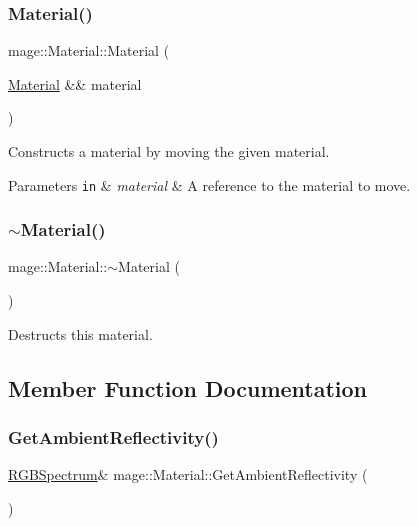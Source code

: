 \subsubsection{\texorpdfstring{Material()}{Material()}\hspace{0.1cm}{\footnotesize\ttfamily [3/3]}}
{\footnotesize\ttfamily mage\+::\+Material\+::\+Material (\begin{DoxyParamCaption}\item[{\hyperlink{structmage_1_1_material}{Material} \&\&}]{material }\end{DoxyParamCaption})\hspace{0.3cm}{\ttfamily [default]}}

Constructs a material by moving the given material.


\begin{DoxyParams}[1]{Parameters}
\mbox{\tt in}  & {\em material} & A reference to the material to move. \\
\hline
\end{DoxyParams}
\hypertarget{structmage_1_1_material_a4ca65b7e24144ee08dd1ce8d0eda9284}{}\label{structmage_1_1_material_a4ca65b7e24144ee08dd1ce8d0eda9284} 
\subsubsection{\texorpdfstring{$\sim$\+Material()}{~Material()}}
{\footnotesize\ttfamily mage\+::\+Material\+::$\sim$\+Material (\begin{DoxyParamCaption}{ }\end{DoxyParamCaption})\hspace{0.3cm}{\ttfamily [default]}}

Destructs this material. 

\subsection{Member Function Documentation}
\hypertarget{structmage_1_1_material_a244df193031de84daf6cb9b8c30f0d72}{}\label{structmage_1_1_material_a244df193031de84daf6cb9b8c30f0d72} 
\subsubsection{\texorpdfstring{Get\+Ambient\+Reflectivity()}{GetAmbientReflectivity()}\hspace{0.1cm}{\footnotesize\ttfamily [1/2]}}
{\footnotesize\ttfamily \hyperlink{structmage_1_1_r_g_b_spectrum}{R\+G\+B\+Spectrum}\& mage\+::\+Material\+::\+Get\+Ambient\+Reflectivity (\begin{DoxyParamCaption}{ }\end{DoxyParamCaption})\hspace{0.3cm}{\ttfamily [noexcept]}}

